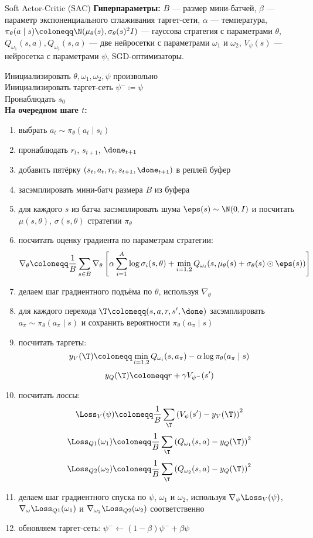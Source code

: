 \begin{algorithm}[label = SACalgorithm]{Soft Actor-Critic (SAC)}
\textbf{Гиперпараметры:} $B$ --- размер мини-батчей, $\beta$ --- параметр экспоненциального сглаживания таргет-сети, $\alpha$ --- температура, $\pi_{\theta}(a \mid s) \coloneqq \N(\mu_{\theta}(s), \sigma_{\theta}(s)^2 I)$ --- гауссова стратегия с параметрами $\theta$, $Q_{\omega_1}(s, a), Q_{\omega_2}(s, a)$ --- две нейросетки с параметрами $\omega_1$ и $\omega_2$, $V_\psi(s)$ --- нейросетка с параметрами $\psi$, SGD-оптимизаторы.

\vspace{0.3cm}
Инициализировать $\theta, \omega_1, \omega_2, \psi$ произвольно \\
Инициализировать таргет-сеть $\psi^- \coloneqq \psi$ \\
Пронаблюдать $s_0$ \\
\textbf{На очередном шаге $t$:}
\begin{enumerate}
    \item выбрать $a_t \sim \pi_\theta(a_t \mid s_t)$
    \item пронаблюдать $r_t$,  $s_{t+1}$, $\done_{t+1}$
    \item добавить пятёрку $(s_t, a_t, r_t, s_{t+1}, \done_{t+1})$ в реплей буфер
    \item засэмплировать мини-батч размера $B$ из буфера
    \item для каждого $s$ из батча засэмплировать шума $\eps(s) \sim \N(0, I)$ и посчитать $\mu(s, \theta)$, $\sigma(s, \theta)$ стратегии $\pi_\theta$
    \item посчитать оценку градиента по параметрам стратегии:
    $$\nabla_\theta \coloneqq \frac{1}{B}\sum_{s \in B} \nabla_\theta \left[ \alpha \sum_{i=1}^A \log \sigma_i(s, \theta) + \min_{i=1,2} Q_{\omega_i}(s, \mu_\theta(s) + \sigma_\theta(s) \odot \eps(s)) \right]$$
    \item делаем шаг градиентного подъёма по $\theta$, используя $\nabla_\theta$
    \item для каждого перехода $\T \coloneqq (s, a, r, s', \done)$ засэмплировать $a_{\pi} \sim \pi_\theta(a_{\pi} \mid s)$ и сохранить вероятности $\pi_\theta(a_\pi \mid s)$
    \item посчитать таргеты:
    $$y_V(\T ) \coloneqq \min_{i = 1, 2} Q_{\omega_i} ( s, a_\pi ) - \alpha \log \pi_\theta(a_\pi \mid s)$$
    $$y_Q(\T ) \coloneqq r + \gamma V_{\psi^{-}}(s')$$
    \item посчитать лоссы:
    $$\Loss_V(\psi) \coloneqq \frac{1}{B}\sum_{\T} \left( V_{\psi}(s') - y_V(\T ) \right) ^2$$
    $$\Loss_{Q1}(\omega_1) \coloneqq \frac{1}{B}\sum_{\T} \left( Q_{\omega_1}(s, a) - y_Q(\T ) \right) ^2$$
    $$\Loss_{Q2}(\omega_2) \coloneqq \frac{1}{B}\sum_{\T} \left( Q_{\omega_2}(s, a) - y_Q(\T ) \right) ^2$$
    \item делаем шаг градиентного спуска по $\psi$, $\omega_1$ и $\omega_2$, используя $\nabla_\psi \Loss_V(\psi)$, $\nabla_\omega \Loss_{Q1}(\omega_1)$ и $\nabla_{\omega_2} \Loss_{Q2}(\omega_2)$ соответственно
    \item обновляем таргет-сеть: $\psi^{-} \leftarrow (1 - \beta) \psi^{-} + \beta \psi$
\end{enumerate}
\end{algorithm}

